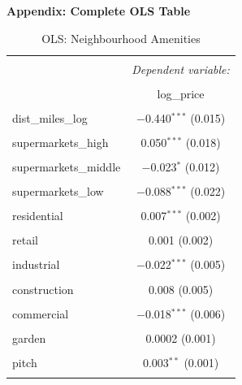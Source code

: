 \documentclass{article}
\begin{document}
\newpage
\nocite{*}
\renewcommand\harvardyearleft{\unskip, }
\renewcommand\harvardyearright[1]{.}
\let\oldthebibliography\thebibliography
\renewcommand\thebibliography{\let\bf\relax\oldthebibliography}
\renewcommand{\refname}{\textbf{Bibliography}}
  



\newpage
\textbf{Appendix: Complete OLS Table}
\begin{table}[H] \centering 
  \caption{OLS: Neighbourhood Amenities} 
  \label{table:complete} 
\small 
\begin{tabular}{@{\extracolsep{-10pt}}lc} 
\\[-1.8ex]\hline 
\hline \\[-1.8ex] 
 & \multicolumn{1}{c}{\textit{Dependent variable:}} \\ 
\cline{2-2} 
\\[-1.8ex] & log\_price \\ 
\hline \\[-1.8ex] 
 dist\_miles\_log & $-$0.440$^{***}$ (0.015) \\ 
  & \\ 
 supermarkets\_high & 0.050$^{***}$ (0.018) \\ 
  & \\ 
 supermarkets\_middle & $-$0.023$^{*}$ (0.012) \\ 
  & \\ 
 supermarkets\_low & $-$0.088$^{***}$ (0.022) \\ 
  & \\ 
 residential & 0.007$^{***}$ (0.002) \\ 
  & \\ 
 retail & 0.001 (0.002) \\ 
  & \\ 
 industrial & $-$0.022$^{***}$ (0.005) \\ 
  & \\ 
 construction & 0.008 (0.005) \\ 
  & \\ 
 commercial & $-$0.018$^{***}$ (0.006) \\ 
  & \\ 
 garden & 0.0002 (0.001) \\ 
  & \\ 
 pitch & 0.003$^{**}$ (0.001) \\ 
  & \\ 

\end{tabular}
\end{table}
\end{document}

